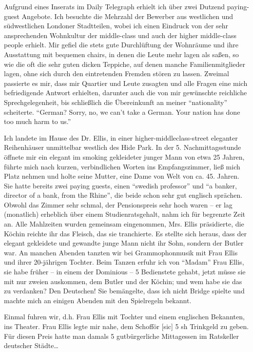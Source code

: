 \documentclass[a5paper,pagesize,10pt,twoside=true]{scrbook}
\renewcommand{\marginpar}[2][]{}
\begin{document}
Aufgrund eines Inserats im Daily Telegraph erhielt ich über zwei Dutzend paying-guest Angebote. Ich besuchte die Mehrzahl der Bewerber aus westlichen und südwestlichen Londoner Stadtteilen, wobei ich einen Eindruck von der sehr ansprechenden Wohnkultur der middle-class und auch der higher middle-class people erhielt. Mir gefiel die stets gute Durchlüftung der Wohnräume und ihre Ausstattung mit bequemen chairs, in denen die Leute mehr lagen als saßen, so wie die oft die sehr guten dicken Teppiche, auf denen manche Familienmitglieder lagen, ohne sich durch den \marginpar{474} eintretenden Fremden stören zu lassen. Zweimal passierte es mir, dass mir Quartier und Leute zusagten und alle Fragen eine mich befriedigende Antwort erhielten, darunter auch die von mir gewünschte reichliche Sprechgelegenheit, bis schließlich die Übereinkunft an meiner \enquote{nationality} scheiterte. \enquote{German? Sorry, no, we can't take a German. Your nation has done too much harm to us.}

Ich landete im Hause des Dr. Ellis, in einer higher-middleclass-street eleganter Reihenhäuser unmittelbar westlich des Hide Park. In der 5. Nachmittagsstunde öffnete mir ein elegant im smoking gekleideter junger Mann von etwa 25 Jahren, führte mich nach kurzen, verbindlichen Worten ins Empfangszimmer, ließ mich Platz nehmen und holte seine Mutter, eine Dame von Welt von ca. 45. Jahren. Sie hatte bereits zwei paying guests, einen \enquote{swedish professor} und \enquote{a banker, director of a bank, from the Rhine}, die beide schon sehr gut englisch sprächen. Obwohl das Zimmer sehr schmal, der Pensionspreis sehr hoch waren -- er lag (monatlich) erheblich über einem Studienratsgehalt, nahm ich für begrenzte Zeit an. Alle Mahlzeiten wurden gemeinsam eingenommen, Mrs. Ellis präsidierte, die Köchin reichte ihr das Fleisch, das sie tranchierte. Es stellte sich heraus, dass der elegant gekleidete und gewandte junge Mann nicht ihr Sohn, sondern der Butler war. An manchen Abenden tanzten wir bei Grammophonmusik mit Frau Ellis und ihrer 20-jährigen Tochter. Beim Tanzen erfuhr ich von \enquote{Madam} Frau Ellis, sie habe früher -- in einem der Dominious -- 5 Bedienstete gehabt, jetzt müsse sie mit nur zweien auskommen, dem Butler und der Köchin; und wem habe sie das zu verdanken? Den Deutschen! Sie bemängelte, dass ich nicht Bridge spielte und machte mich an einigen Abenden mit den Spielregeln bekannt.

Einmal fuhren wir, d.h. Frau Ellis mit Tochter und einem englischen Bekannten, ins Theater. Frau Ellis legte mir nahe, dem Schofför [sic] 5 sh Trinkgeld zu geben. Für diesen Preis hatte man damals 5 gutbürgerliche Mittagessen im Ratskeller deutscher Städte\dots
\end{document}
